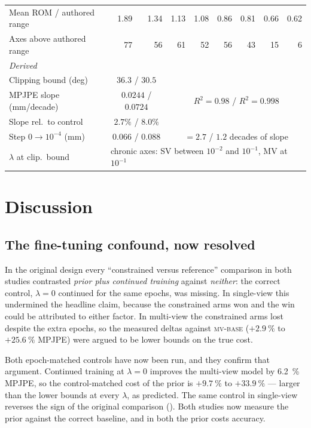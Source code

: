 \documentclass[11pt,a4paper]{article}
\newcommand{\lam}{\lambda}
\newcommand{\armbase}{\textsc{mv-base}}
\begin{document}
\begin{table}[t]
\begin{tabular}{l rr rr rr rr}
Mean ROM / authored range    & 1.89 & 1.34 & 1.13 & 1.08 & 0.86 & 0.81 & 0.66 & 0.62 \\
Axes above authored range    & 77 & 56 & 61 & 52 & 56 & 43 & 15 & 6 \\
\midrule
\multicolumn{9}{l}{\emph{Derived}}\\
Clipping bound (deg)         & \multicolumn{2}{c}{$36.3$ \quad / \quad $30.5$} & \multicolumn{6}{c}{} \\
MPJPE slope (mm/decade)      & \multicolumn{2}{c}{$0.0244$ \quad / \quad $0.0724$} & \multicolumn{6}{c}{$R^2 = 0.98$ \quad / \quad $R^2 = 0.998$} \\
Slope rel.\ to control       & \multicolumn{2}{c}{$2.7\%$ \quad / \quad $8.0\%$} & \multicolumn{6}{c}{} \\
Step $0 \to 10^{-4}$ (mm)     & \multicolumn{2}{c}{$0.066$ \quad / \quad $0.088$} & \multicolumn{6}{c}{$=2.7$ \quad / \quad $1.2$ decades of slope} \\
$\lam$ at clip.\ bound       & \multicolumn{8}{l}{chronic axes: SV between $10^{-2}$ and $10^{-1}$, MV at $10^{-1}$} \\
\bottomrule
\end{tabular}
\end{table}

\section{Discussion}
\label{sec:discussion}

\subsection{The fine-tuning confound, now resolved}
\label{sec:disc-confound}

In the original design every ``constrained versus reference'' comparison in
both studies contrasted \emph{prior plus continued training} against
\emph{neither}: the correct control, $\lam = 0$ continued for the same epochs,
was missing. In single-view this undermined the headline claim, because the
constrained arms won and the win could be attributed to either factor. In
multi-view the constrained arms lost despite the extra epochs, so the measured
deltas against \armbase{} ($+\SI{2.9}{\percent}$ to $+\SI{25.6}{\percent}$
MPJPE) were argued to be lower bounds on the true cost.

Both epoch-matched controls have now been run, and they confirm that
argument. Continued training at $\lam = 0$ improves the multi-view model by
\SI{6.2}{\percent} MPJPE, so the control-matched cost of the prior is
$+\SI{9.7}{\percent}$ to $+\SI{33.9}{\percent}$ --- larger than the lower
bounds at every $\lam$, as predicted. The same control in single-view reverses
the sign of the original comparison (\cite{sv}). Both studies now measure the
prior against the correct baseline, and in both the prior costs accuracy.
\end{document}
